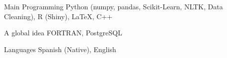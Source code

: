 

\begin{cvskills}


  \cvskill
    {Main Programming} %
    {Python (numpy, pandas, Scikit-Learn, NLTK, Data Cleaning), R (Shiny), \LaTeX, C++}
  
 \cvskill
    {A global idea} %
    {FORTRAN, PostgreSQL} %

  \cvskill
    {Languages} %
    {Spanish (Native), English} %

\end{cvskills}
